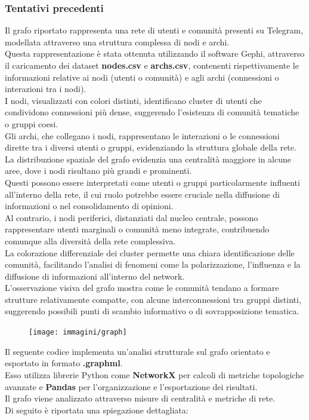 \documentclass[12pt]{article}
\begin{document}
	\subsubsection{Tentativi precedenti}
	Il grafo riportato rappresenta una rete di utenti e comunità presenti su Telegram, modellata attraverso una struttura complessa di nodi e archi. \\Questa rappresentazione è stata ottenuta utilizzando il software Gephi, attraverso il caricamento dei dataset \textbf{nodes.csv} e \textbf{archs.csv}, contenenti rispettivamente le informazioni relative ai nodi (utenti o comunità) e agli archi (connessioni o interazioni tra i nodi). \\I nodi, visualizzati con colori distinti, identificano cluster di utenti che condividono connessioni più dense, suggerendo l'esistenza di comunità tematiche o gruppi coesi. \\Gli archi, che collegano i nodi, rappresentano le interazioni o le connessioni dirette tra i diversi utenti o gruppi, evidenziando la struttura globale della rete.\\
	La distribuzione spaziale del grafo evidenzia una centralità maggiore in alcune aree, dove i nodi risultano più grandi e prominenti.\\ Questi possono essere interpretati come utenti o gruppi particolarmente influenti all'interno della rete, il cui ruolo potrebbe essere cruciale nella diffusione di informazioni o nel consolidamento di opinioni.\\ Al contrario, i nodi periferici, distanziati dal nucleo centrale, possono rappresentare utenti marginali o comunità meno integrate, contribuendo comunque alla diversità della rete complessiva.\\
	La colorazione differenziale dei cluster permette una chiara identificazione delle comunità, facilitando l'analisi di fenomeni come la polarizzazione, l'influenza e la diffusione di informazioni all'interno del network.\\ L'osservazione visiva del grafo mostra come le comunità tendano a formare strutture relativamente compatte, con alcune interconnessioni tra gruppi distinti, suggerendo possibili punti di scambio informativo o di sovrapposizione tematica.
	\begin{figure}[H]
		\centering
		\texttt{[image: immagini/graph]}
	\end{figure}
	Il seguente codice implementa un’analisi strutturale sul grafo orientato e esportato in formato \textbf{.graphml}. \\Esso utilizza librerie Python come \textbf{NetworkX} per calcoli di metriche topologiche avanzate e \textbf{Pandas} per l’organizzazione e l’esportazione dei risultati. \\ Il grafo viene analizzato attraverso misure di centralità e metriche di rete. \\Di seguito è riportata una spiegazione dettagliata:
\end{document}

